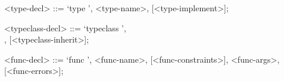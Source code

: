 \documentclass{acm_proc_article-sp}
\begin{document}
\begin{appendices}
\begin{grammar}
            <type-decl> ::= `type ', <type-name>, [<type-implement>];

            <typeclass-decl> ::= `typeclass ',
            \\<typeclass-name>, [<typeclass-inherit>];

            <func-decl> ::= `func ', <func-name>, [<func-constraints>], <func-args>, [<func-errors>];

            \end{grammar}
\end{appendices}


\balancecolumns
\end{document}
